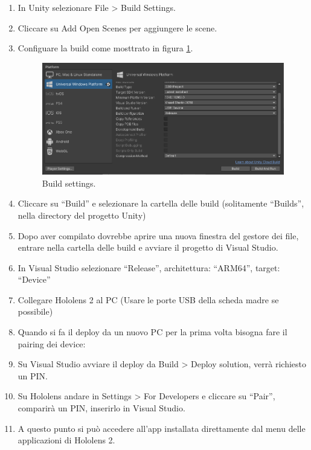 \begin{enumerate}
    \item In Unity selezionare File > Build Settings.
    \item Cliccare su Add Open Scenes per aggiungere le scene.
    \item Configuare la build come mosttrato in figura \ref{pic:build-settings}.
    
    \begin{figure}[H]
        \includegraphics[width=12cm]{Images/hololens_build_settings.png}
        \centering
        \caption{\label{pic:build-settings}Build settings.}
    \end{figure}
    
    \item Cliccare su “Build” e selezionare la cartella delle build (solitamente “Builds”, nella directory del progetto Unity)
    \item Dopo aver compilato dovrebbe aprire una nuova finestra del gestore dei file, entrare nella cartella delle build e avviare il progetto di Visual Studio.
    \item In Visual Studio selezionare “Release”, architettura: “ARM64”, target: “Device” 
    \item Collegare Hololens 2 al PC (Usare le porte USB della scheda madre se possibile)
    \item Quando si fa il deploy da un nuovo PC per la prima volta bisogna fare il pairing dei device:
    \item Su Visual Studio avviare il deploy da Build > Deploy solution, verrà richiesto un PIN.
    \item Su Hololens andare in Settings > For Developers e cliccare su “Pair”, comparirà un PIN, inserirlo in Visual Studio.
    \item A questo punto si può accedere all’app installata direttamente dal menu delle applicazioni di Hololens 2.
\end{enumerate}

